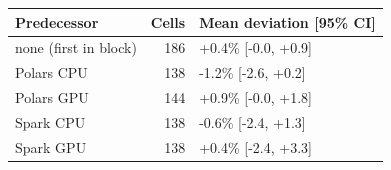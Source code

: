 \begin{tabular}{lrl}
\toprule
Predecessor & Cells & Mean deviation [95\% CI] \\
\midrule
none (first in block) & 186 & +0.4\% [-0.0, +0.9] \\
Polars CPU & 138 & -1.2\% [-2.6, +0.2] \\
Polars GPU & 144 & +0.9\% [-0.0, +1.8] \\
Spark CPU & 138 & -0.6\% [-2.4, +1.3] \\
Spark GPU & 138 & +0.4\% [-2.4, +3.3] \\
\bottomrule
\end{tabular}
